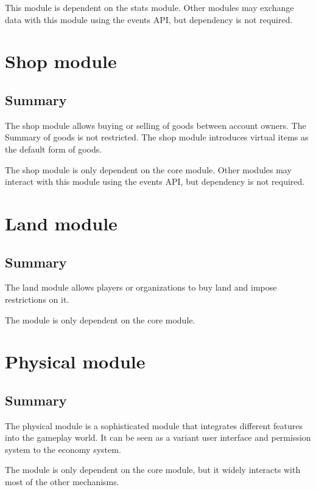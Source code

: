 \documentclass{report}
\begin{document}
			This module is dependent on the stats module.
			Other modules may exchange data with this module using the events API,
			but dependency is not required.

	\part{Shop module}
		\chapter{Summary}

			The shop module allows buying or selling of goods between account owners.
			The Summary of goods is not restricted.
			The shop module introduces virtual items as the default form of goods.

			The shop module is only dependent on the core module.
			Other modules may interact with this module using the events API,
			but dependency is not required.

	\part{Land module}
		\chapter{Summary}

			The land module allows players or organizations to buy land and impose restrictions on it.

			The module is only dependent on the core module.

	\part{Physical module}
		\label{sec:physical-module}
		\chapter{Summary}
			The physical module is a sophisticated module that integrates different features into the gameplay world.
			It can be seen as a variant user interface and permission system to the economy system.

			The module is only dependent on the core module, but it widely interacts with most of the other mechanisms.
\end{document}
